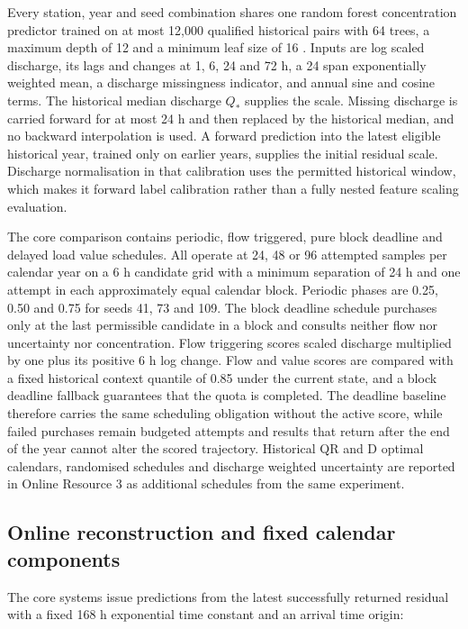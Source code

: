 \documentclass[pdflatex,sn-mathphys-num]{sn-jnl}%
\theoremstyle{thmstyleone}%
\theoremstyle{thmstyletwo}%
\theoremstyle{thmstylethree}%
\begin{document}
Every station, year and seed combination shares one random forest concentration predictor trained on at most 12,000 qualified historical pairs with 64 trees, a maximum depth of 12 and a minimum leaf size of 16 \citep{breiman2001}. Inputs are log scaled discharge, its lags and changes at 1, 6, 24 and 72 h, a 24 span exponentially weighted mean, a discharge missingness indicator, and annual sine and cosine terms. The historical median discharge $Q_*$ supplies the scale. Missing discharge is carried forward for at most 24 h and then replaced by the historical median, and no backward interpolation is used. A forward prediction into the latest eligible historical year, trained only on earlier years, supplies the initial residual scale. Discharge normalisation in that calibration uses the permitted historical window, which makes it forward label calibration rather than a fully nested feature scaling evaluation.

The core comparison contains periodic, flow triggered, pure block deadline and delayed load value schedules. All operate at 24, 48 or 96 attempted samples per calendar year on a 6 h candidate grid with a minimum separation of 24 h and one attempt in each approximately equal calendar block. Periodic phases are 0.25, 0.50 and 0.75 for seeds 41, 73 and 109. The block deadline schedule purchases only at the last permissible candidate in a block and consults neither flow nor uncertainty nor concentration. Flow triggering scores scaled discharge multiplied by one plus its positive 6 h log change. Flow and value scores are compared with a fixed historical context quantile of 0.85 under the current state, and a block deadline fallback guarantees that the quota is completed. The deadline baseline therefore carries the same scheduling obligation without the active score, while failed purchases remain budgeted attempts and results that return after the end of the year cannot alter the scored trajectory. Historical QR and D optimal calendars, randomised schedules and discharge weighted uncertainty are reported in Online Resource 3 as additional schedules from the same experiment.

\subsection{Online reconstruction and fixed calendar components}

The core systems issue predictions from the latest successfully returned residual with a fixed 168 h exponential time constant and an arrival time origin:
\end{document}
